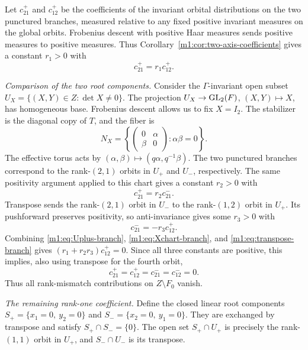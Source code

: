 Let $c_{21}^+$ and $c_{12}^+$ be the coefficients of the invariant orbital
distributions on the two punctured branches, measured relative to any
fixed positive invariant measures on the global orbits. Frobenius descent
with positive Haar measures sends positive measures to positive measures.
Thus Corollary~\ref{m1:cor:two-axis-coefficients} gives a constant $r_1>0$ with
\begin{equation}\label{m1:eq:Uplus-branch}
    c_{21}^+=r_1c_{12}^+.
\end{equation}

\emph{Comparison of the two root components.}
Consider the $\Gamma$-invariant open subset \(U_X=\{(X,Y)\in Z:\det X\neq0\}\). The projection
$U_X\to\operatorname{GL}_2(F)$, $(X,Y)\mapsto X$, has homogeneous base.
Frobenius descent allows us to fix $X=I_2$.  The stabilizer is the diagonal
copy of $T$, and the fiber is
\[
    N_X=
    \left\{
    \begin{pmatrix}0&\alpha\\\beta&0\end{pmatrix}:
    \alpha\beta=0
    \right\}.
\]
The effective torus acts by \((\alpha,\beta)\longmapsto(q\alpha,q^{-1}\beta)\). The two punctured
branches correspond to the rank-$(2,1)$ orbits in $U_+$
and $U_-$, respectively. The same positivity argument applied to this
chart gives a constant $r_2>0$ with
\begin{equation}\label{m1:eq:Xchart-branch}
 c_{21}^+=r_2c_{21}^-.
\end{equation}
Transpose sends the rank-$(2,1)$ orbit in $U_-$ to the
rank-$(1,2)$ orbit in $U_+$. Its pushforward preserves positivity, so anti-invariance gives
some $r_3>0$ with
\begin{equation}\label{m1:eq:transpose-branch}
 c_{21}^-=-r_3c_{12}^+.
\end{equation}
Combining \eqref{m1:eq:Uplus-branch}, \eqref{m1:eq:Xchart-branch}, and
\eqref{m1:eq:transpose-branch} gives $(r_1+r_2r_3)c_{12}^+=0$. Since all three constants are positive, this
implies, also using transpose for the fourth orbit,
\[
    c_{21}^+=c_{12}^+=c_{21}^-=c_{12}^-=0.
\]
Thus all rank-mismatch contributions on $Z\setminus F_0$ vanish.

\emph{The remaining rank-one coefficient.}
Define the closed linear root components \(S_+=\{x_1=0,\ y_2=0\}\) and \(S_-=\{x_2=0,\
y_1=0\}\). They are exchanged by transpose and satisfy \(S_+\cap S_-=\{0\}\). The open set $S_+\cap U_+$
is precisely the rank-$(1,1)$ orbit in $U_+$,
and $S_-\cap U_-$ is its transpose.

